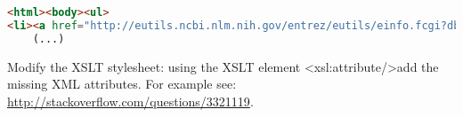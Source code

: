 \documentclass{article}
\begin{document}
\begin{lstlisting}[language=html]
<html><body><ul>
<li><a href="http://eutils.ncbi.nlm.nih.gov/entrez/eutils/einfo.fcgi?db=pubmed">pubmed</a></li>
    (...)
\end{lstlisting} 
\noindent
Modify the XSLT stylesheet: using the XSLT element \textless{}xsl:attribute/\textgreater add the missing XML attributes. For example see: \url{http://stackoverflow.com/questions/3321119}.
\end{document}
